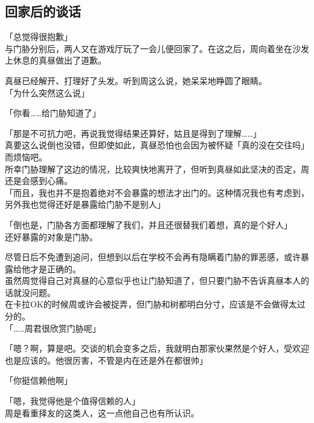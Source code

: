 \subsection{回家后的谈话}

「总觉得很抱歉」\\

与门胁分别后，两人又在游戏厅玩了一会儿便回家了。在这之后，周向着坐在沙发上休息的真昼做出了道歉。

真昼已经解开、打理好了头发。听到周这么说，她呆呆地睁圆了眼睛。\\

「为什么突然这么说」

「你看……给门胁知道了」

「那是不可抗力吧，再说我觉得结果还算好，姑且是得到了理解……」\\

真要这么说倒也没错，但即使如此，真昼恐怕也会因为被怀疑「真的没在交往吗」而烦恼吧。\\

所幸门胁理解了这边的情况，比较爽快地离开了，但听到真昼如此坚决的否定，周还是会感到心痛。\\

「而且，我也并不是抱着绝对不会暴露的想法才出门的。这种情况我也有考虑到，另外我也觉得还好是暴露给门胁不是别人」

「倒也是，门胁各方面都理解了我们，并且还很替我们着想，真的是个好人」\\

还好暴露的对象是门胁。

尽管日后不免遭到追问，但想到以后在学校不会再有隐瞒着门胁的罪恶感，或许暴露给他才是正确的。\\

虽然周觉得自己对真昼的心意似乎也让门胁知道了，但只要门胁不告诉真昼本人的话就没问题。\\

在卡拉OK的时候周或许会被捉弄，但门胁和树都明白分寸，应该是不会做得太过分的。\\

「……周君很欣赏门胁呢」

「嗯？啊，算是吧。交谈的机会变多之后，我就明白那家伙果然是个好人，受欢迎也是应该的。他很厉害，不管是内在还是外在都很帅」

「你挺信赖他啊」

「嗯，我觉得他是个值得信赖的人」\\

周是看重择友的这类人，这一点他自己也有所认识。\\

